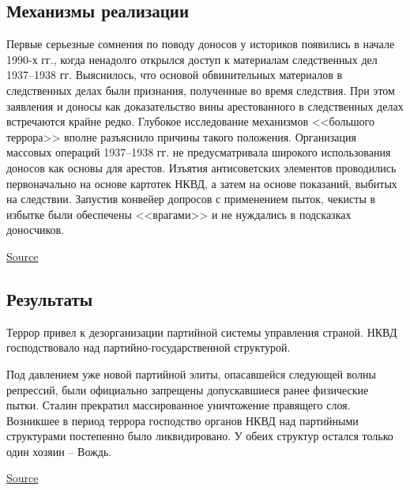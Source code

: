 \documentclass[12pt]{article}
\newcommand{\teal}[1]{{\color{teal}{#1}}}
\newcommand{\block}[1]{\vspace{-1em}\begin{framed}#1\end{framed}\vspace{-\lastskip}\vspace{-.1cm}\hfill}
\gdef\vurl{\href{https://www.vedomosti.ru/opinion/articles/2017/07/06/712528-bolshogo-terrora}{Source}}
\begin{document}
  \subsection{Механизмы реализации}
  \teal{тут было написано что доносы это миф}
  \block{
    Первые серьезные сомнения по поводу доносов у историков появились в начале 1990-х гг.,
    когда ненадолго открылся доступ к материалам следственных дел 1937--1938 гг.
    Выяснилось, что основой обвинительных материалов в следственных делах были признания, полученные во время следствия.
    При этом заявления и доносы как доказательство вины арестованного в следственных делах встречаются крайне редко.
    Глубокое исследование механизмов <<большого террора>> вполне разъяснило причины такого положения.
    Организация массовых операций 1937--1938 гг. не предусматривала широкого использования доносов как основы для арестов.
    Изъятия антисоветских элементов проводились первоначально на основе картотек НКВД, а затем на основе показаний, выбитых на следствии.
    Запустив конвейер допросов с применением пыток, чекисты в избытке были обеспечены <<врагами>> и не нуждались в подсказках доносчиков.
  }\vurl

  \subsection{Результаты}
  Террор привел к дезорганизации партийной системы управления страной.
  НКВД господствовало над партийно-государственной структурой.
  \block{
    Под давлением уже новой партийной элиты, опасавшейся следующей волны репрессий, были официально запрещены допускавшиеся ранее физические пытки.
    Сталин прекратил массированное уничтожение правящего слоя.
    Возникшее в период террора господство органов НКВД над партийными структурами постепенно было ликвидировано.
    У обеих структур остался только один хозяин -- Вождь.
  }\href{https://history.wikireading.ru/32558}{Source}

  \teal{тут можно ещё сказать что Советско-финляндская война была настолько провальной, потомучто небыло нармальных генералов, тк их всех растреляли}

\end{document}
